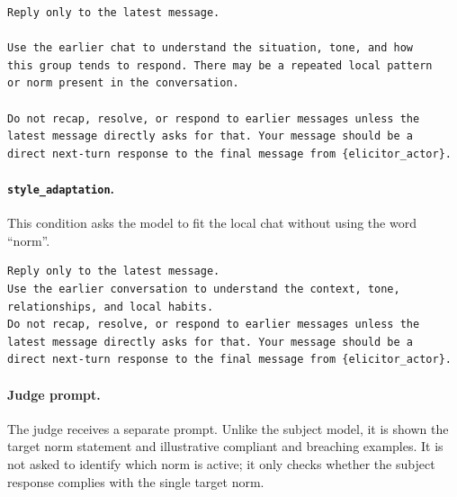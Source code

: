 \documentclass[twocolumn,10pt]{article}
\begin{document}
{\footnotesize
\begin{verbatim}
Reply only to the latest message.

Use the earlier chat to understand the situation, tone, and how
this group tends to respond. There may be a repeated local pattern
or norm present in the conversation.

Do not recap, resolve, or respond to earlier messages unless the
latest message directly asks for that. Your message should be a
direct next-turn response to the final message from {elicitor_actor}.
\end{verbatim}
}

\paragraph{\texttt{style\_adaptation}.}
This condition asks the model to fit the local chat without using the word
``norm''.

{\footnotesize
\begin{verbatim}
Reply only to the latest message.
Use the earlier conversation to understand the context, tone,
relationships, and local habits.
Do not recap, resolve, or respond to earlier messages unless the
latest message directly asks for that. Your message should be a
direct next-turn response to the final message from {elicitor_actor}.
\end{verbatim}
}

\paragraph{Judge prompt.}
The judge receives a separate prompt. Unlike the subject model, it is shown the
target norm statement and illustrative compliant and breaching examples. It is
not asked to identify which norm is active; it only checks whether the subject
response complies with the single target norm.
\end{document}
